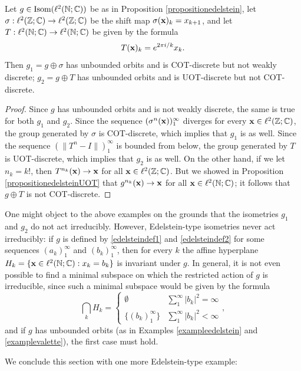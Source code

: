\begin{example}
Let $g\in\Isom(\ell^2(\N;\C))$ be as in Proposition \ref{propositionedelstein}, let $\sigma:\ell^2(\Z;\C)\to\ell^2(\Z;\C)$ be the shift map $\sigma(\mathbf x)_k = x_{k + 1}$, and let $T:\ell^2(\N;\C)\to\ell^2(\N;\C)$ be given by the formula
\[
T(\mathbf x)_k = e^{2\pi i/k} x_k.
\]
Then $g_1 = g\oplus\sigma$ has unbounded orbits and is COT-discrete but not weakly discrete; $g_2 = g\oplus T$ has unbounded orbits and is UOT-discrete but not COT-discrete.
\end{example}
\begin{proof}
Since $g$ has unbounded orbits and is not weakly discrete, the same is true for both $g_1$ and $g_2$. Since the sequence $(\sigma^n(\mathbf x))_1^\infty$ diverges for every $\xx\in\ell^2(\Z;\C)$, the group generated by $\sigma$ is COT-discrete, which implies that $g_1$ is as well. Since the sequence $(\|T^n - I\|)_1^\infty$ is bounded from below, the group generated by $T$ is UOT-discrete, which implies that $g_2$ is as well. On the other hand, if we let $n_k = k!$, then $T^{n_k}(\mathbf x)\to \mathbf x$ for all $\xx\in\ell^2(\Z;\C)$. But we showed in Proposition \ref{propositionedelsteinUOT} that $g^{n_k}(\mathbf x)\to \mathbf x$ for all $\xx\in\ell^2(\N;\C)$; it follows that $g\oplus T$ is not COT-discrete.
\end{proof}

\begin{remark}
One might object to the above examples on the grounds that the isometries $g_1$ and $g_2$ do not act irreducibly. However, Edelstein-type isometries never act irreducibly: if $g$ is defined by \eqref{edelsteindef1} and \eqref{edelsteindef2} for some sequences $(a_k)_1^\infty$ and $(b_k)_1^\infty$, then for every $k$ the affine hyperplane $H_k = \{\xx\in \ell^2(\N;\C) : x_k = b_k\}$ is invariant under $g$. In general, it is not even possible to find a minimal subspace on which the restricted action of $g$ is irreducible, since such a minimal subspace would be given by the formula
\[
\bigcap_k H_k = \begin{cases}
\emptyset & \sum_1^\infty |b_k|^2 = \infty\\
\{(b_k)_1^\infty\} & \sum_1^\infty |b_k|^2 < \infty
\end{cases},
\]
and if $g$ has unbounded orbits (as in Examples \ref{exampleedelstein} and \ref{examplevalette}), the first case must hold.
\end{remark}

We conclude this section with one more Edelstein-type example:

